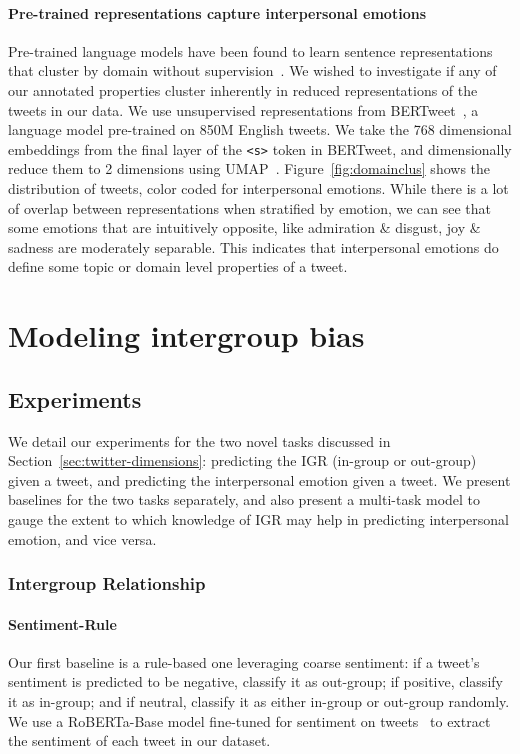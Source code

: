 \paragraph{Pre-trained representations capture interpersonal emotions} Pre-trained language models have been found to learn sentence representations that cluster by domain without supervision~\citep{aharoni-goldberg-2020-unsupervised}. We wished to investigate if any of our annotated properties cluster inherently in reduced representations of the tweets in our data. We use unsupervised representations from BERTweet~\citep{nguyen_bertweet_2020}, a language model pre-trained on 850M English tweets. We take the 768 dimensional embeddings from the final layer of the \texttt{<s>} token in BERTweet, and dimensionally reduce them to 2 dimensions using UMAP~\citep{sainburg2021parametric}. Figure~\ref{fig:domainclus} shows the distribution of tweets, color coded for interpersonal emotions. While there is a lot of overlap between representations when stratified by emotion, we can see that some emotions that are intuitively opposite, like admiration \& disgust, joy \& sadness are moderately separable. This indicates that interpersonal emotions do define some topic or domain level properties of a tweet.

\section{Modeling intergroup bias}
\label{sec:twitter-model}

\subsection{Experiments}

We detail our experiments for the two novel tasks discussed in Section~\ref{sec:twitter-dimensions}: predicting the IGR (in-group or out-group) given a tweet, and predicting the interpersonal emotion given a tweet. We present baselines for the two tasks separately, and also present a multi-task model to gauge the extent to which knowledge of IGR may help in predicting interpersonal emotion, and vice versa.

\subsubsection{Intergroup Relationship}

\paragraph{Sentiment-Rule} Our first baseline is a rule-based one leveraging coarse sentiment: if a tweet's sentiment is predicted to be negative, classify it as out-group; if positive, classify it as in-group; and if neutral, classify it as either in-group or out-group randomly. We use a RoBERTa-Base model fine-tuned for sentiment on tweets~\citep{barbieri-etal-2020-tweeteval} to extract the sentiment of each tweet in our dataset.
    

